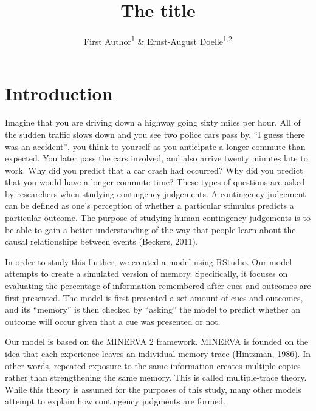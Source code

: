 \documentclass[
  english,
  man]{apa6}
\title{The title}
\author{First Author\textsuperscript{1} \& Ernst-August Doelle\textsuperscript{1,2}}
\date{}
\affiliation{\vspace{0.5cm}\textsuperscript{1} Wilhelm-Wundt-University\\\textsuperscript{2} Konstanz Business School}
\begin{document}
\maketitle

\hypertarget{introduction}{%
\section{Introduction}\label{introduction}}

Imagine that you are driving down a highway going sixty miles per hour. All of the sudden traffic slows down and you see two police cars pass by. \enquote{I guess there was an accident}, you think to yourself as you anticipate a longer commute than expected. You later pass the cars involved, and also arrive twenty minutes late to work. Why did you predict that a car crash had occurred? Why did you predict that you would have a longer commute time? These types of questions are asked by researchers when studying contingency judgements. A contingency judgement can be defined as one's perception of whether a particular stimulus predicts a particular outcome. The purpose of studying human contingency judgements is to be able to gain a better understanding of the way that people learn about the causal relationships between events (Beckers, 2011).

In order to study this further, we created a model using RStudio. Our model attempts to create a simulated version of memory. Specifically, it focuses on evaluating the percentage of information remembered after cues and outcomes are first presented. The model is first presented a set amount of cues and outcomes, and its \enquote{memory} is then checked by \enquote{asking} the model to predict whether an outcome will occur given that a cue was presented or not.

Our model is based on the MINERVA 2 framework. MINERVA is founded on the idea that each experience leaves an individual memory trace (Hintzman, 1986). In other words, repeated exposure to the same information creates multiple copies rather than strengthening the same memory. This is called multiple-trace theory. While this theory is assumed for the purposes of this study, many other models attempt to explain how contingency judgments are formed.
\end{document}
